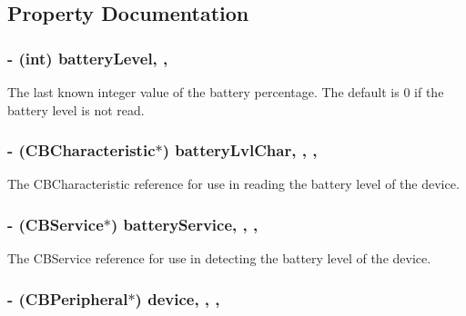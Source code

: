 \subsection{Property Documentation}
\hypertarget{interface_fit_bit_flex_a6141ecb075c9553d179dc5210d2c4952}{
\subsubsection[{battery\-Level}]{\setlength{\rightskip}{0pt plus 5cm}-\/ (int) battery\-Level\hspace{0.3cm}{\ttfamily [read]}, {\ttfamily [write]}, {\ttfamily [atomic]}}}\label{interface_fit_bit_flex_a6141ecb075c9553d179dc5210d2c4952}
The last known integer value of the battery percentage. The default is 0 if the battery level is not read. \hypertarget{interface_fit_bit_flex_a0d5ca990dbff1852b3d8a07faa91234b}{
\subsubsection[{battery\-Lvl\-Char}]{\setlength{\rightskip}{0pt plus 5cm}-\/ (C\-B\-Characteristic$\ast$) battery\-Lvl\-Char\hspace{0.3cm}{\ttfamily [read]}, {\ttfamily [write]}, {\ttfamily [atomic]}, {\ttfamily [retain]}}}\label{interface_fit_bit_flex_a0d5ca990dbff1852b3d8a07faa91234b}
The C\-B\-Characteristic reference for use in reading the battery level of the device. \hypertarget{interface_fit_bit_flex_af23b05b17587b9810d93909f279cca75}{
\subsubsection[{battery\-Service}]{\setlength{\rightskip}{0pt plus 5cm}-\/ (C\-B\-Service$\ast$) battery\-Service\hspace{0.3cm}{\ttfamily [read]}, {\ttfamily [write]}, {\ttfamily [atomic]}, {\ttfamily [retain]}}}\label{interface_fit_bit_flex_af23b05b17587b9810d93909f279cca75}
The C\-B\-Service reference for use in detecting the battery level of the device. \hypertarget{interface_fit_bit_flex_ac539ad853d5729137679c3293cba75f5}{
\subsubsection[{device}]{\setlength{\rightskip}{0pt plus 5cm}-\/ (C\-B\-Peripheral$\ast$) device\hspace{0.3cm}{\ttfamily [read]}, {\ttfamily [write]}, {\ttfamily [atomic]}, {\ttfamily [retain]}}}\label{interface_fit_bit_flex_ac539ad853d5729137679c3293cba75f5}
